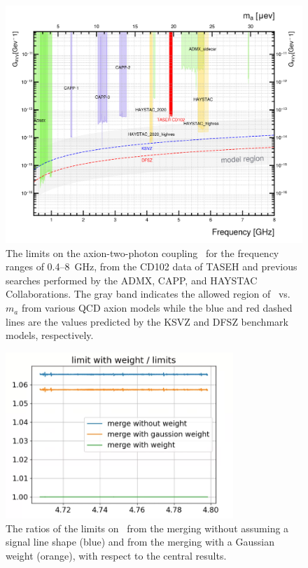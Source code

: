 \begin{figure} [htbp]
  \centering
 \includegraphics[width=17.2cm]{figures/RealData_limit_allexp.png}
  \caption{The limits on the axion-two-photon coupling \gagg\ for the 
frequency ranges of 0.4--8~GHz, from the CD102 data of TASEH and previous 
searches performed by the ADMX, CAPP, and HAYSTAC Collaborations. The gray 
band indicates the allowed region of \gagg\ vs. $m_a$ from various QCD axion 
models while the blue and red dashed lines are the values predicted by the 
KSVZ and DFSZ benchmark models, respectively.}
  \label{fig:gaggall}
\end{figure}


\begin{figure} [htbp]
  \centering
 \includegraphics[width=8.6cm]{figures/limitratio_weights.png}
  \caption{The ratios of the limits on \gagg\ from the merging without 
 assuming a signal line shape (blue) and from the merging with a 
 Gaussian weight (orange), with respect to the central 
 results. }
  \label{fig:limitratio}
\end{figure}
